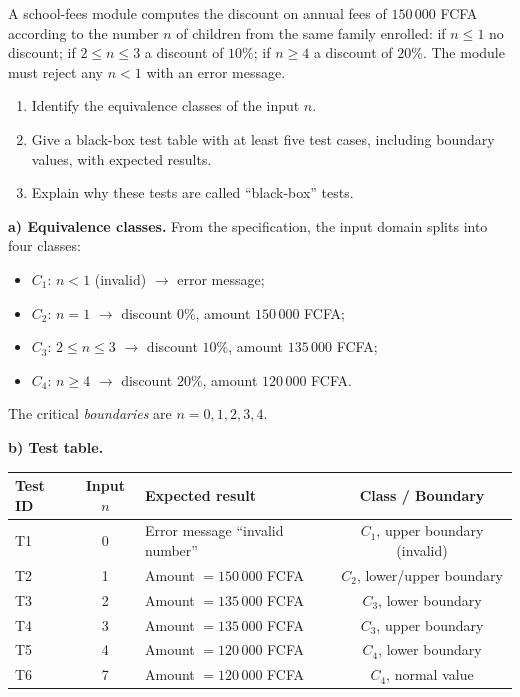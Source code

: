 \documentclass[11pt]{article}
\begin{document}
\begin{exoresolu}
A school-fees module computes the discount on annual fees of $150\,000$ FCFA according to the number $n$ of children from the same family enrolled: if $n \leq 1$ no discount; if $2 \leq n \leq 3$ a discount of $10\%$; if $n \geq 4$ a discount of $20\%$. The module must reject any $n < 1$ with an error message.
\begin{enumerate}
\item[a)] Identify the equivalence classes of the input $n$.
\item[b)] Give a black-box test table with at least five test cases, including boundary values, with expected results.
\item[c)] Explain why these tests are called ``black-box'' tests.
\end{enumerate}
\tcblower
\textbf{a) Equivalence classes.} From the specification, the input domain splits into four classes:
\begin{itemize}
\item $C_1$: $n < 1$ (invalid) $\rightarrow$ error message;
\item $C_2$: $n = 1$ $\rightarrow$ discount $0\%$, amount $150\,000$ FCFA;
\item $C_3$: $2 \leq n \leq 3$ $\rightarrow$ discount $10\%$, amount $135\,000$ FCFA;
\item $C_4$: $n \geq 4$ $\rightarrow$ discount $20\%$, amount $120\,000$ FCFA.
\end{itemize}
The critical \emph{boundaries} are $n = 0, 1, 2, 3, 4$.

\textbf{b) Test table.}

\begin{center}
\begin{tabularx}{\linewidth}{|l|c|X|c|}
\hline
\rowcolor{popblueL} Test ID & Input $n$ & Expected result & Class / Boundary \\
\hline
T1 & 0 & Error message ``invalid number'' & $C_1$, upper boundary (invalid) \\
T2 & 1 & Amount $= 150\,000$ FCFA & $C_2$, lower/upper boundary \\
T3 & 2 & Amount $= 135\,000$ FCFA & $C_3$, lower boundary \\
T4 & 3 & Amount $= 135\,000$ FCFA & $C_3$, upper boundary \\
T5 & 4 & Amount $= 120\,000$ FCFA & $C_4$, lower boundary \\
T6 & 7 & Amount $= 120\,000$ FCFA & $C_4$, normal value \\
\hline
\end{tabularx}
\end{center}


\end{exoresolu}
\end{document}
